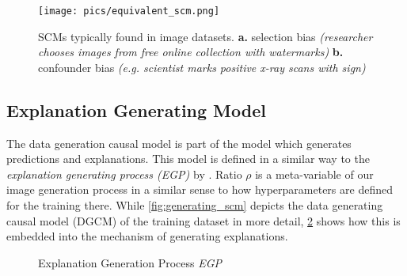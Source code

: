 \begin{figure}[t!]
    \centering
    \texttt{[image: pics/equivalent\_scm.png]}
    \caption[Selection vs. Confounder Bias]{SCMs typically found in image datasets.
    \textbf{a.} selection bias \textit{(researcher chooses images from free online collection with watermarks)}
    \textbf{b.} confounder bias \textit{(e.g. scientist marks positive x-ray scans with sign)}}
    \label{fig:equivalent_scm}
\end{figure}

\subsection{Explanation Generating Model}
The data generation causal model is part of the model which generates predictions and explanations.
This model is defined in a similar way to the \textit{explanation generating process (EGP)} by \citet{Karimi2023}.
Ratio $\rho$ is a meta-variable of our image generation process in a similar sense to how hyperparameters are defined for the training there. While \cref{fig:generating_scm} depicts the data generating causal model (DGCM) of the training dataset in more detail, \cref{fig:egp} shows how this is embedded into the mechanism of generating explanations. 

\begin{figure}[t!]
    \centering
    \caption[Explanation Generation Process (EGP)]{Explanation Generation Process \textit{EGP}}
    \label{fig:egp}
\end{figure}


